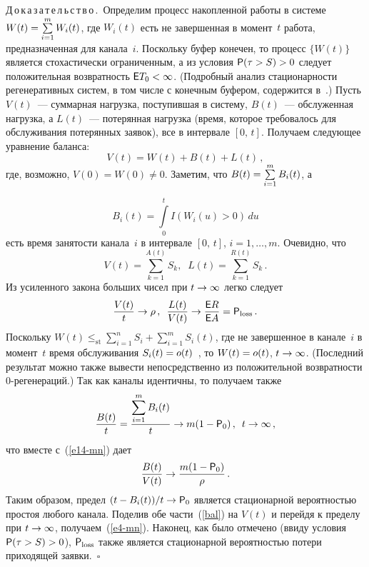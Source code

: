 \begin{multicols}{2}
\noindent
Д\,о\,к\,а\,з\,а\,т\,е\,л\,ь\,с\,т\,в\,о\,.\
Определим процесс накопленной работы в сис\-те\-ме
$W(t)\hm=\sum\limits_{i=1}^mW_i(t)$, где $W_i(t)$ есть не завершенная  в момент~$t$ 
работа, предназначенная для   канала~$i$. Поскольку буфер
конечен, то процесс $\{W(t)\}$  является стохастически ограниченным, 
а из условия $\p(\tau>S)\hm>0$ следует  положительная возвратность
 $\e T_0\hm<\infty$.  (Подробный анализ стационарности регенеративных сис\-тем, 
 в том числе с конечным буфером, содержится в~\cite{Morozov2004, MorozovDelgado}.) 
 Пусть  $V(t)$~--- суммарная нагрузка, поступившая в сис\-те\-му, 
 $B(t)$~--- обслуженная нагрузка, а $L(t)$~--- потерянная нагрузка (время, которое требовалось для обслуживания
потерянных заявок), все в интервале $[0,\,t]$. Получаем следующее уравнение баланса:
\begin{equation}
 V(t)=W(t)+B(t)+L(t)\,,
 \label{bal}
\end{equation} 
где, возможно, $V(0)=W(0)\not =0$. Заметим, что $B(t)\hm=\sum\limits_{i=1}^mB_i(t)$, а 

\noindent
$$
B_i(t)=\int\limits_0^tI(W_i(u)>0)\,du 
$$ есть время занятости канала~$i$ в интервале $[0,\,t]$, $i=1,\ldots,m$. Очевидно,  что
\begin{equation}
V(t)=\sum_{k=1}^{A(t)}S_k,\;\; L(t)=\sum\limits_{k=1}^{R(t)}S_k\,.
\label{e11-mn}
\end{equation}
Из  усиленного закона больших чисел при $t\hm\to\infty$  легко следует
\begin{equation}
\displaystyle\frac{\displaystyle V(t)\mathstrut}{\displaystyle t\mathstrut}\to \rho\,,\enskip \displaystyle\frac{\displaystyle L(t)\mathstrut}{\displaystyle V(t)\mathstrut} \to
\displaystyle\frac{\displaystyle {\sf E} R\mathstrut}{\displaystyle {\sf E} A\mathstrut}= {\sf P}_{\mathrm{loss}}\,.
\label{e14-mn}
 \end{equation} 
 Поскольку
$W(t)\le_{\!\mathrm{st}}\sum\limits_{i=1}^nS_i+\sum\limits_{i=1}^mS_i(t)$, 
где не завершенное в канале~$i$ в момент~$t$ время обслуживания 
$S_i(t)\hm=o(t)$~\cite{Smith}, то $W(t)\hm=o(t)$, $t\hm\to \infty$. (Последний результат
можно также вывести непосредственно из положительной возвратности
$0$-ре\-ге\-не\-ра\-ций.) Так как каналы идентичны, то получаем также
\begin{equation}
\displaystyle\frac{\displaystyle B(t)\mathstrut}{\displaystyle t\mathstrut}=\displaystyle\frac{\displaystyle \sum\limits_{i=1}^mB_i(t)\mathstrut}{\displaystyle t\mathstrut}\to m(1-{\sf P}_0)\,,\enskip t\to \infty\,,
\label{e16-mn}
 \end{equation}
  что  вместе с~(\ref{e14-mn}) дает
 \begin{equation*}
\displaystyle\frac{\displaystyle B(t)\mathstrut}{\displaystyle V(t)\mathstrut}\to \displaystyle\frac{\displaystyle m(1-{\sf P}_0)\mathstrut}{\displaystyle \rho\mathstrut}\,.
\end{equation*} 
Таким образом, предел $(t-B_i(t))/t\hm\to \p_0$ является стационарной вероятностью простоя любого
канала. Поделив обе части~(\ref{bal}) на $V(t)$ и перейдя к пределу при $t\hm\to\infty$, 
получаем~(\ref{e4-mn}). Наконец, как было отмечено (ввиду  условия
$\p(\tau>S)\hm>0$),  ${\sf P}_{\mathrm{loss}}$ также  является стационарной вероятностью потери приходящей 
заявки.~\hfill$\square$


\end{multicols}
